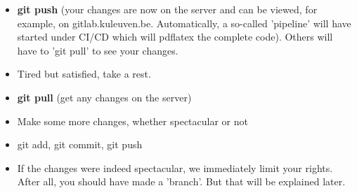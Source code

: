 \documentclass{ximera}
\begin{document}
\begin{itemize}
\item \textbf{git push} (your changes are now on the server and can be viewed, for example, on gitlab.kuleuven.be. Automatically, a so-called 'pipeline' will have started under CI/CD which will pdflatex the complete code). Others will have to 'git pull' to see your changes.

\item Tired but satisfied, take a rest.

\item \textbf{git pull} (get any changes on the server)

\item Make some more changes, whether spectacular or not

\item git add, git commit, git push

\item If the changes were indeed spectacular, we immediately limit your rights. After all, you should have made a 'branch'. But that will be explained later.
\end{itemize}
\end{document}
